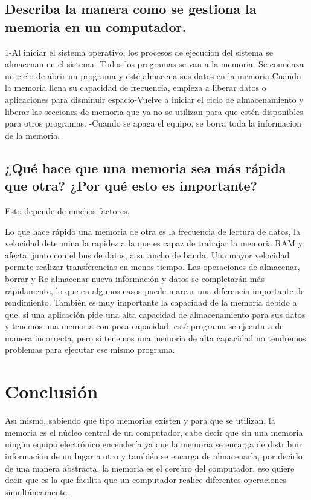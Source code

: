\documentclass{article}
\begin{document}
\subsection{Describa la manera como se gestiona la memoria en un computador.}
1-Al iniciar el sistema operativo, los procesos de ejecucion del sistema se almacenan en el sistema -Todos los programas se van a la memoria -Se comienza un ciclo de abrir un programa y esté almacena sus datos en la memoria-Cuando la memoria llena su capacidad de frecuencia, empieza a liberar datos o aplicaciones para disminuir espacio-Vuelve a iniciar el ciclo de almacenamiento y liberar las secciones de memoria que ya no se utilizan para que estén disponibles para otros programas. -Cuando se apaga el equipo, se borra toda la informacion de la memoria.\newline


\subsection{¿Qué hace que una memoria sea más rápida que otra? ¿Por qué esto es importante?}

Esto depende de muchos factores. \newline

Lo que hace rápido una memoria de otra es la frecuencia de lectura de datos, la velocidad determina la rapidez a la que es capaz de trabajar la memoria RAM y afecta, junto con el bus de datos, a su ancho de banda. Una mayor velocidad permite realizar transferencias en menos tiempo. Las operaciones de almacenar, borrar y Re almacenar nueva información y datos se completarán más rápidamente, lo que en algunos casos puede marcar una diferencia importante de rendimiento. También es muy importante la capacidad de la memoria debido a que, si una aplicación pide una alta capacidad de almacenamiento para sus datos y tenemos una memoria con poca capacidad, esté programa se ejecutara de manera incorrecta, pero si tenemos una memoria de alta capacidad no tendremos problemas para ejecutar ese mismo programa.


\section{Conclusión} \label{conclulsion}

Así mismo, sabiendo que tipo memorias existen y para que se utilizan, la memoria es el núcleo central de un computador, cabe decir que sin una memoria ningún equipo electrónico encendería ya que la memoria se encarga de distribuir información de un lugar a otro y también se encarga de almacenarla, por decirlo de una manera abstracta, la memoria es el cerebro del computador, eso quiere decir que es la que facilita que un computador realice diferentes operaciones simultáneamente.



\end{document}
